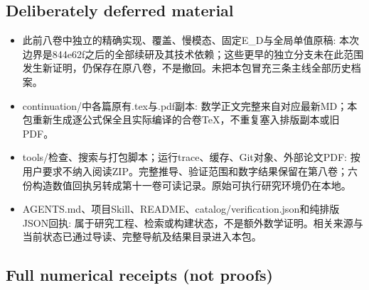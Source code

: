 \documentclass[
  10pt,
]{article}
\providecommand{\tightlist}{%
  \setlength{\itemsep}{0pt}\setlength{\parskip}{0pt}}
\begin{document}
\hypertarget{deliberately-deferred-material}{%
\subsection{Deliberately deferred
material}\label{deliberately-deferred-material}}

\begin{itemize}
\tightlist
\item
  此前八卷中独立的精确实现、覆盖、慢模态、固定E\_D与全局单值原稿:
  本次边界是844e62f之后的全部续研及其技术依赖；这些更早的独立分支未在此范围发生新证明，仍保存在原八卷，不是撤回。未把本包冒充三条主线全部历史档案。
\item
  continuation/中各篇原有.tex与.pdf副本:
  数学正文完整来自对应最新MD；本包重新生成逐公式保全且实际编译的合卷TeX，不重复塞入排版副本或旧PDF。
\item
  tools/检查、搜索与打包脚本；运行trace、缓存、Git对象、外部论文PDF:
  按用户要求不纳入阅读ZIP。完整推导、验证范围和数字结果保留在第八卷；六份构造数值回执另转成第十一卷可读记录。原始可执行研究环境仍在本地。
\item
  AGENTS.md、项目Skill、README、catalog/verification.json和纯排版JSON回执:
  属于研究工程、检索或构建状态，不是额外数学证明。相关来源与当前状态已通过导读、完整导航及结果目录进入本包。
\end{itemize}

\hypertarget{full-numerical-receipts-not-proofs}{%
\subsection{Full numerical receipts (not
proofs)}\label{full-numerical-receipts-not-proofs}}
\end{document}
